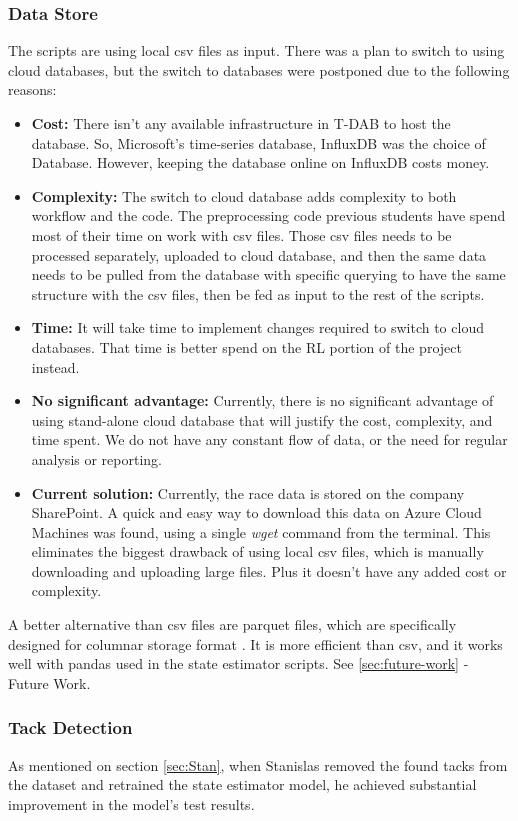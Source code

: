 \documentclass[12pt,twoside]{report}
\begin{document}
\subsubsection{Data Store}
The scripts are using local csv files as input. There was a plan to switch to using cloud databases, but the switch to databases were postponed due to the following reasons:

\begin{itemize}
  \item \textbf{Cost:} There isn't any available infrastructure in T-DAB to host the database. So, Microsoft's time-series database, InfluxDB was the choice of Database. However, keeping the database online on InfluxDB costs money.
  \item \textbf{Complexity:} The switch to cloud database adds complexity to both workflow and the code. The preprocessing code previous students have spend most of their time on work with csv files. Those csv files needs to be processed separately, uploaded to cloud database, and then the same data needs to be pulled from the database with specific querying to have the same structure with the csv files, then be fed as input to the rest of the scripts.
  \item \textbf{Time:} It will take time to implement changes required to switch to cloud databases. That time is better spend on the RL portion of the project instead.
  \item \textbf{No significant advantage:} Currently, there is no significant advantage of using stand-alone cloud database that will justify the cost, complexity, and time spent. We do not have any constant flow of data, or the need for regular analysis or reporting.
  \item \textbf{Current solution:} Currently, the race data is stored on the company SharePoint. A quick and easy way to download this data on Azure Cloud Machines was found, using a single \textit{wget} command from the terminal. This eliminates the biggest drawback of using local csv files, which is manually downloading and uploading large files. Plus it doesn't have any added cost or complexity.
\end{itemize}

A better alternative than csv files are parquet files, which are specifically designed for columnar storage format \cite{parquet}. It is more efficient than csv, and it works well with pandas used in the state estimator scripts. See \ref{sec:future-work} - Future Work.

\subsubsection{Tack Detection}
As mentioned on section \ref{sec:Stan}, when Stanislas removed the found tacks from the dataset and retrained the state estimator model, he achieved substantial improvement in the model's test results. 
\end{document}

